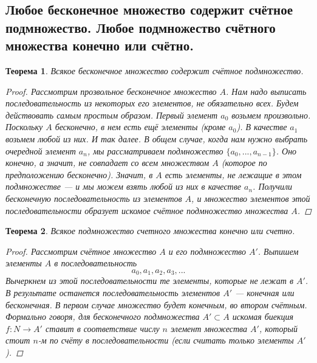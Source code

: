 \documentclass{article}
\newtheorem{theorem}{Теорема}
\begin{document}
\subsection{Любое бесконечное множество содержит счётное подмножество. Любое подмножество счётного множества конечно или счётно.}
\begin{theorem}
Всякое бесконечное множество содержит счётное подмножество.
\begin{proof}
Рассмотрим прозвольное бесконечное множество $A$. Нам надо выписать последовательность из некоторых его элементов, не обязательно всех. Будем действовать самым простым образом. Первый элемент $a_0$ возьмем произвольно. Поскольку $A$ бесконечно, в нем есть ещё элементы (кроме $a_0$). В качестве $a_1$ возьмем любой из них. И так далее. В общем случае, когда нам нужно выбрать очередной элемент $a_n$, мы рассматриваем подмножество $\{ a_0, . . . , a_{n-1} \}$. Оно конечно, а значит, не совпадает со всем множеством $A$ (которое по предположению бесконечно). Значит, в $A$ есть элементы, не лежащие в этом подмножестве — и мы можем взять любой из них в качестве $a_n$.
\newline
Получили бесконечную последовательность из элементов $A$, и множество элементов этой последовательности образует искомое счётное подмножество множества $A$.
\end{proof}
\end{theorem}

\begin{theorem}
Всякое подмножество счетного множества конечно или счетно.
\begin{proof}
Рассмотрим счётное множество $A$ и его подмножество $A'$. Выпишем элементы $A$ в последовательность
\[
a_0,a_1,a_2,a_3,...
\]
Вычеркнем из этой последовательности те элементы, которые не лежат в $A'$. В результате останется последовательность элементов $A'$ — конечная или бесконечная. В первом случае множество будет конечным, во втором счётным. Формально говоря, для бесконечного подмножества $A' \subset A$ искомая биекция $f : N \to A'$ ставит в соответствие числу $n$ элемент множества $A'$, который стоит $n$-м по счёту в последовательности (если считать только элементы $A'$).
\end{proof}
\end{theorem}
\end{document}
